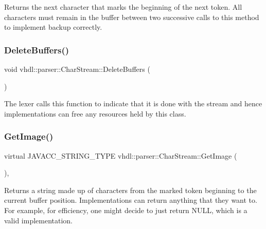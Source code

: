 Returns the next character that marks the beginning of the next token. All characters must remain in the buffer between two successive calls to this method to implement backup correctly. \mbox{\label{classvhdl_1_1parser_1_1_char_stream_ade1113e8f90c93ce43cb949205f4746f}} 
\subsubsection{\texorpdfstring{DeleteBuffers()}{DeleteBuffers()}}
{\footnotesize\ttfamily void vhdl\+::parser\+::\+Char\+Stream\+::\+Delete\+Buffers (\begin{DoxyParamCaption}{ }\end{DoxyParamCaption})\hspace{0.3cm}{\ttfamily [virtual]}}

The lexer calls this function to indicate that it is done with the stream and hence implementations can free any resources held by this class. \mbox{\label{classvhdl_1_1parser_1_1_char_stream_a83b0313890fbf2fa4f8443039472db87}} 
\subsubsection{\texorpdfstring{GetImage()}{GetImage()}}
{\footnotesize\ttfamily virtual J\+A\+V\+A\+C\+C\+\_\+\+S\+T\+R\+I\+N\+G\+\_\+\+T\+Y\+PE vhdl\+::parser\+::\+Char\+Stream\+::\+Get\+Image (\begin{DoxyParamCaption}{ }\end{DoxyParamCaption})\hspace{0.3cm}{\ttfamily [inline]}, {\ttfamily [virtual]}}

Returns a string made up of characters from the marked token beginning to the current buffer position. Implementations can return anything that they want to. For example, for efficiency, one might decide to just return N\+U\+LL, which is a valid implementation. \mbox{\label{classvhdl_1_1parser_1_1_char_stream_a6a3f7e4e14d712f26aa3728c8e0e4dbf}} 
